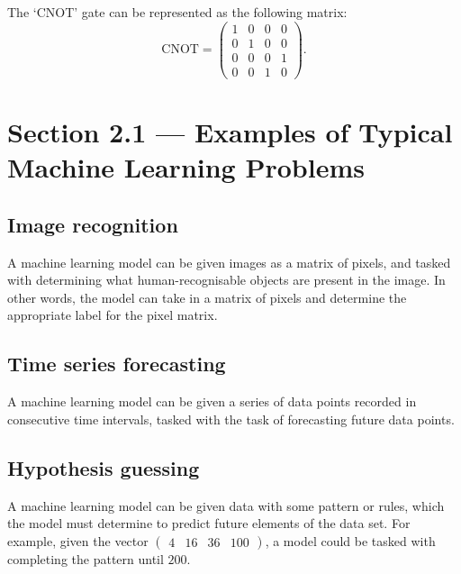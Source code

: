 \documentclass{article}
\theoremstyle{definition}
\begin{document}
The `CNOT' gate can be represented as the following matrix:\\
\[ \mathrm{CNOT} = \begin{pmatrix}
    1 & 0 & 0 & 0\\
    0 & 1 & 0 & 0\\
    0 & 0 & 0 & 1\\
    0 & 0 & 1 & 0
\end{pmatrix} .\]

\section{Section 2.1 --- Examples of Typical Machine Learning Problems}

\subsection{Image recognition}
A machine learning model can be given images as a matrix of pixels, and tasked with determining what human-recognisable objects are present in the image. In other words, the model can take in a matrix of pixels and determine the appropriate label for the pixel matrix.

\subsection{Time series forecasting}
A machine learning model can be given a series of data points recorded in consecutive time intervals, tasked with the task of forecasting future data points.

\subsection{Hypothesis guessing}
A machine learning model can be given data with some pattern or rules, which the model must determine to predict future elements of the data set. For example, given the vector $\begin{pmatrix}
    4 & 16 & 36 & 100
\end{pmatrix}$, a model could be tasked with completing the pattern until $200$.
\end{document}
